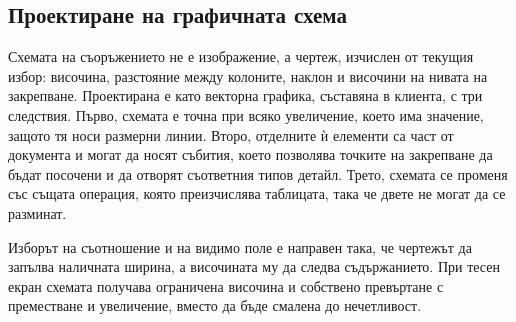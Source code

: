 \subsection{Проектиране на графичната схема}
\label{subsec:schematic}

Схемата на съоръжението не е изображение, а чертеж, изчислен от текущия избор:
височина, разстояние между колоните, наклон и височини на нивата на закрепване.
Проектирана е като векторна графика, съставяна в клиента, с три следствия. Първо,
схемата е точна при всяко увеличение, което има значение, защото тя носи размерни
линии. Второ, отделните ѝ елементи са част от документа и могат да носят събития,
което позволява точките на закрепване да бъдат посочени и да отворят съответния
типов детайл. Трето, схемата се променя със същата операция, която преизчислява
таблицата, така че двете не могат да се разминат.

Изборът на съотношение и на видимо поле е направен така, че чертежът да запълва
наличната ширина, а височината му да следва съдържанието. При тесен екран схемата
получава ограничена височина и собствено превъртане с преместване и увеличение, вместо
да бъде смалена до нечетливост.
